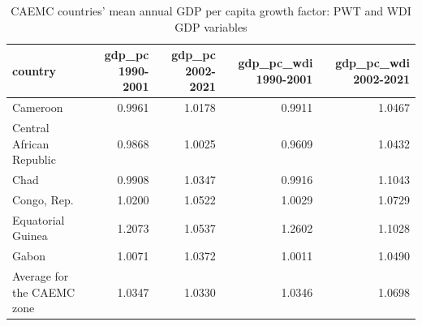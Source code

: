 \begin{table}

\caption{CAEMC countries' mean annual GDP per capita growth factor: PWT and WDI GDP variables}
\centering
\begin{tabular}[t]{lrrrr}
\toprule
country & gdp\_pc 1990-2001 & gdp\_pc 2002-2021 & gdp\_pc\_wdi 1990-2001 & gdp\_pc\_wdi 2002-2021\\
\midrule
Cameroon & 0.9961 & 1.0178 & 0.9911 & 1.0467\\
Central African Republic & 0.9868 & 1.0025 & 0.9609 & 1.0432\\
Chad & 0.9908 & 1.0347 & 0.9916 & 1.1043\\
Congo, Rep. & 1.0200 & 1.0522 & 1.0029 & 1.0729\\
Equatorial Guinea & 1.2073 & 1.0537 & 1.2602 & 1.1028\\
\addlinespace
Gabon & 1.0071 & 1.0372 & 1.0011 & 1.0490\\
Average for the CAEMC zone & 1.0347 & 1.0330 & 1.0346 & 1.0698\\
\bottomrule
\end{tabular}
\end{table}